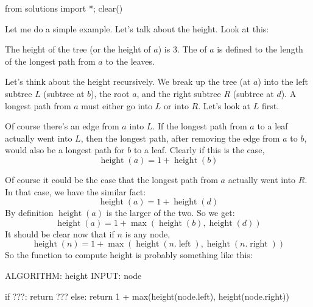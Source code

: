 \begin{python0}
from solutions import *; clear()
\end{python0}

Let me do a simple example.
Let's talk about the height.
Look at this:


The height of the tree (or the height of $a$) is 3.
The  of $a$ is defined to the length of the 
longest path from $a$ to the leaves.

Let's think about the height recursively.
We break up the tree (at $a$) into the left subtree $L$ (subtree at $b$),
the root $a$, and the right subtree $R$ (subtree at $d$).
A longest path from $a$ must either go into $L$ or into $R$.
Let's look at $L$ first.

Of course there's an edge from $a$ into $L$.
If the longest path from $a$ to a leaf actually went into $L$,
then the longest path, after removing the edge from $a$ to $b$,
would also be a longest path for $b$ to a leaf.
Clearly if this is the case,
\[
\operatorname{height}(a) = 1 + \operatorname{height}(b)
\]

Of course it could be the case that the longest path from $a$
actually went into $R$.
In that case, we have the similar fact:
\[
\operatorname{height}(a) = 1 + \operatorname{height}(d)
\]
By definition $\operatorname{height}(a)$ is the larger of the two.
So we get:
\[
\operatorname{height}(a) = 1 + \max(
\operatorname{height}(b),
\operatorname{height}(d))
\]
It should be clear now that if $n$ is any node,
\[
\operatorname{height}(n) = 1 + \max(
\operatorname{height}(n.\operatorname{left}),
\operatorname{height}(n.\operatorname{right}))
\]
So the function to compute height is probably something like this:
\begin{console}
ALGORITHM: height
INPUT:     node

if ???:
    return ???
else:
    return 1 + max(height(node.left), height(node.right))
\end{console}

